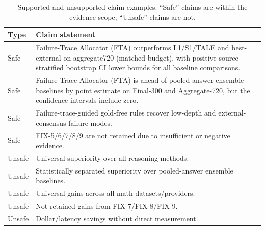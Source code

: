 \begin{table}[H]
\centering
\caption{Supported and unsupported claim examples. ``Safe'' claims are within the evidence scope; ``Unsafe'' claims are not.}
\label{tab:claim_language}
\small
\begin{tabular}{lp{}}
\toprule
Type & Claim statement \\
\midrule
Safe & Failure-Trace Allocator (FTA) outperforms L1/S1/TALE and best-external on aggregate720 (matched budget), with positive source-stratified bootstrap CI lower bounds for all baseline comparisons. \\
Safe & Failure-Trace Allocator (FTA) is ahead of pooled-answer ensemble baselines by point estimate on Final-300 and Aggregate-720, but the confidence intervals include zero. \\
Safe & Failure-trace-guided gold-free rules recover low-depth and external-consensus failure modes. \\
Safe & FIX-5/6/7/8/9 are not retained due to insufficient or negative evidence. \\
Unsafe & Universal superiority over all reasoning methods. \\
Unsafe & Statistically separated superiority over pooled-answer ensemble baselines. \\
Unsafe & Universal gains across all math datasets/providers. \\
Unsafe & Not-retained gains from FIX-7/FIX-8/FIX-9. \\
Unsafe & Dollar/latency savings without direct measurement. \\
\bottomrule
\end{tabular}
\end{table}
